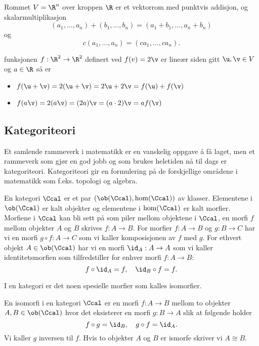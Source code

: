 \begin{example}\label{Ex:EukVRom}
    Rommet $V = \R^n$ over kroppen $\R$ er et vektorrom med punktvis addisjon, og skalarmultiplikasjon
    \[(a_1,\dots,a_n)+(b_1,\dots,b_n) = (a_1+b_1,\dots,a_n+b_n)\]
    og
    \[c(a_1,\dots,a_n)=(ca_1,\dots,ca_n).\]
\end{example}

\begin{example}\label{Ex:label}
    funksjonen $f:\R^2\to\R^2$ definert ved $f(v) = 2\v$ er lineær siden gitt $\u,\v\in V$ og $a\in\R$ så er
    \begin{itemize}
        \item $f(\u+\v) = 2(\u+\v) = 2\u+2\v = f(\u)+f(\v)$
        \item $f(a\v) = 2(a\v) = (2a)\v = (a\cdot2)\v = af(\v)$
    \end{itemize}
\end{example}

\subsection{Kategoriteori}\label{Sec:Katgoriteori}
Et samlende rammeverk i matematikk er en vanskelig oppgave å få laget, men et rammeverk som gjør en god jobb og som brukes heletiden nå til dags er kategoriteori. Kategoriteori gir en formulering på de forskjellige områdene i matematikk som f.eks. topologi og algebra.

\begin{definition}\label{Def:Kategori}
    En kategori $\Ccal$ er et par $(\ob(\Ccal),\hom(\Ccal))$ av klasser. Elementene i $\ob(\Ccal)$ er kalt objekter og elementene i $\hom(\Ccal)$ er kalt morfier. Morfiene i $\Ccal$ kan bli sett på som piler mellom objektene i $\Ccal$, en morfi $f$ mellom objekter $A$ og $B$ skrives $f:A\to B$.
    For morfier $f: A\to B$ og $g: B\to C$ har vi en morfi $g\circ f: A\to C$ som vi kaller komposisjonen av $f$ med $g$.
    For ethvert objekt $A\in\ob(\Ccal)$ har vi en morfi $\id_A: A\to A$ som vi kaller identitetsmorfien som tilfredstiller for enhver morfi $f:A\to B$:
    \[f\circ\id_A = f,\quad \id_B\circ f = f.\]
\end{definition}

I en kategori er det noen spesielle morfier som kalles isomorfier.
\begin{definition}\label{Def:Iso}
    En isomorfi i en kategori $\Ccal$ er en morfi $f:A\to B$ mellom to objekter $A,B\in\ob(\Ccal)$ hvor det eksisterer en morfi $g:B\to A$ slik at følgende holder
    \[f\circ g = \id_B,\quad g\circ f = \id_A.\]
    Vi kaller $g$ inversen til $f$. Hvis to objekter $A$ og $B$ er ismorfe skriver vi $A\cong B$.
\end{definition}

